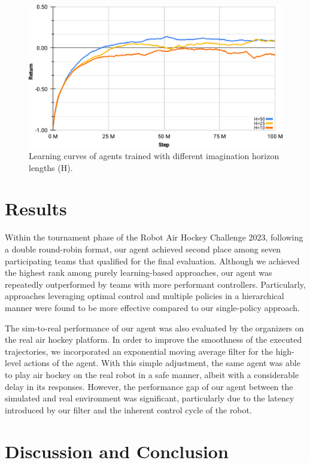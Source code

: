 \documentclass{article}
\begin{document}
\begin{figure}[ht]
    \centering
    \includegraphics[width=0.9\linewidth]{graphics/learning_curve_horizon.png}
    \caption{Learning curves of agents trained with different imagination horizon lengths (H).}
    \label{fig:lc_horizon}
\end{figure}

\newpage

\section{Results}\label{sec:results}

Within the tournament phase of the Robot Air Hockey Challenge 2023, following a double round-robin format, our agent achieved second place among seven participating teams that qualified for the final evaluation. Although we achieved the highest rank among purely learning-based approaches, our agent was repeatedly outperformed by teams with more performant controllers. Particularly, approaches leveraging optimal control and multiple policies in a hierarchical manner were found to be more effective compared to our single-policy approach.

The sim-to-real performance of our agent was also evaluated by the organizers on the real air hockey platform. In order to improve the smoothness of the executed trajectories, we incorporated an exponential moving average filter for the high-level actions of the agent. With this simple adjustment, the same agent was able to play air hockey on the real robot in a safe manner, albeit with a considerable delay in its responses. However, the performance gap of our agent between the simulated and real environment was significant, particularly due to the latency introduced by our filter and the inherent control cycle of the robot.

\section{Discussion and Conclusion}\label{sec:discussion-and-conclusion}
\end{document}
